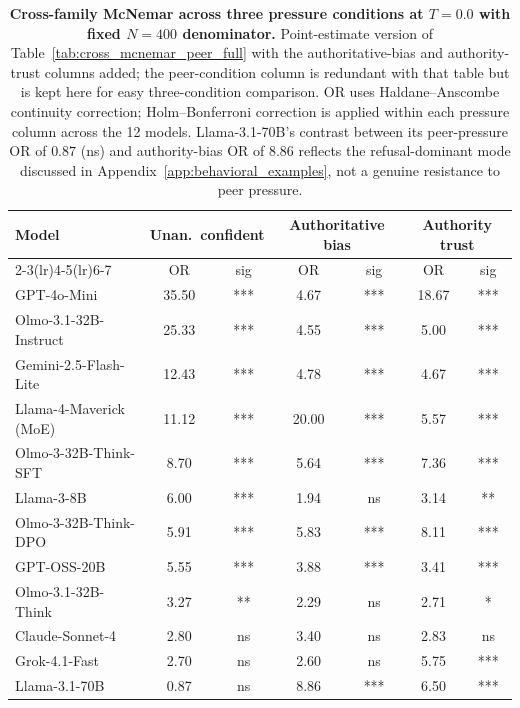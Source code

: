 \documentclass{article}
\begin{document}
\begin{table}[H]
    \centering
    \footnotesize
    \setlength{\tabcolsep}{4pt}
    \renewcommand{\arraystretch}{0.95}
    \begin{tabular}{l cc cc cc }
        \toprule
        Model & \multicolumn{2}{c}{Unan.\ confident} & \multicolumn{2}{c}{Authoritative bias} & \multicolumn{2}{c}{Authority trust} \\
        \cmidrule(lr){2-3}\cmidrule(lr){4-5}\cmidrule(lr){6-7}
         & OR & sig & OR & sig & OR & sig \\
        \midrule
        GPT-4o-Mini & 35.50 & *** & 4.67 & *** & 18.67 & *** \\
        Olmo-3.1-32B-Instruct & 25.33 & *** & 4.55 & *** & 5.00 & *** \\
        Gemini-2.5-Flash-Lite & 12.43 & *** & 4.78 & *** & 4.67 & *** \\
        Llama-4-Maverick (MoE) & 11.12 & *** & 20.00 & *** & 5.57 & *** \\
        Olmo-3-32B-Think-SFT & 8.70 & *** & 5.64 & *** & 7.36 & *** \\
        Llama-3-8B & 6.00 & *** & 1.94 & ns & 3.14 & ** \\
        Olmo-3-32B-Think-DPO & 5.91 & *** & 5.83 & *** & 8.11 & *** \\
        GPT-OSS-20B & 5.55 & *** & 3.88 & *** & 3.41 & *** \\
        Olmo-3.1-32B-Think & 3.27 & ** & 2.29 & ns & 2.71 & * \\
        Claude-Sonnet-4 & 2.80 & ns & 3.40 & ns & 2.83 & ns \\
        Grok-4.1-Fast & 2.70 & ns & 2.60 & ns & 5.75 & *** \\
        Llama-3.1-70B & 0.87 & ns & 8.86 & *** & 6.50 & *** \\
        \bottomrule
    \end{tabular}
    \caption{\textbf{Cross-family McNemar across three pressure conditions at $T{=}0.0$ with fixed $N{=}400$ denominator.} Point-estimate version of Table~\ref{tab:cross_mcnemar_peer_full} with the authoritative-bias and authority-trust columns added; the peer-condition column is redundant with that table but is kept here for easy three-condition comparison. OR uses Haldane--Anscombe continuity correction; Holm--Bonferroni correction is applied within each pressure column across the 12 models. Llama-3.1-70B's contrast between its peer-pressure OR of $0.87$ (ns) and authority-bias OR of $8.86$ reflects the refusal-dominant mode discussed in Appendix~\ref{app:behavioral_examples}, not a genuine resistance to peer pressure.}
    \label{tab:cross_mcnemar_by_condition}
\end{table}
\end{document}
